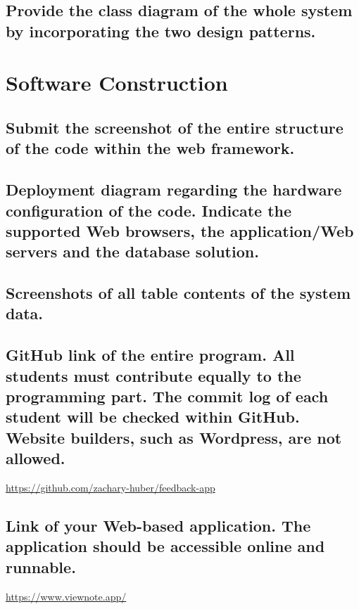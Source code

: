 \documentclass[letterpaper, 12 pt, conference]{ieeeconf}
\begin{document}
\subsection{Provide the class diagram of the whole system by incorporating the two design patterns.}
\linebreak
    \hfill \break

\section{Software Construction}
\subsection{Submit the screenshot of the entire structure of the code within the web framework.}
\linebreak
    \hfill \break
    
\subsection{Deployment diagram regarding the hardware configuration of the code. Indicate the supported Web browsers, the application/Web servers and the database solution.}
\linebreak
    \hfill \break
    
\subsection{Screenshots of all table contents of the system data.}
\linebreak
    \hfill \break
    
\subsection{GitHub link of the entire program. All students must contribute equally to the programming part. The commit log of each student will be checked within GitHub. Website builders, such as Wordpress, are not allowed.}
\linebreak
    \hfill \break
\url{https://github.com/zachary-huber/feedback-app}
\hfill \break

\subsection{Link of your Web-based application. The application should be accessible online and runnable.}
\linebreak
    \hfill \break
\url{https://www.viewnote.app/}
\hfill \break
\end{document}
